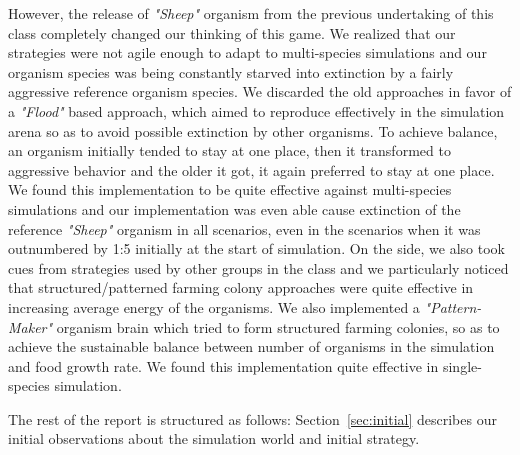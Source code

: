 However, the release of {\em "Sheep"} organism from the previous 
undertaking of this class completely changed our thinking of this game. 
We realized that our strategies were not agile enough to adapt to 
multi-species simulations and our organism species was being constantly 
starved into extinction by a fairly aggressive reference organism species. 
We discarded the old approaches in favor of a {\em "Flood"} based 
approach, which aimed to reproduce effectively in the simulation arena so as 
to avoid possible extinction by other organisms. To achieve balance, an 
organism initially tended to stay at one place, then it transformed to 
aggressive behavior and the older it got, it again preferred to stay at one 
place. 
We found this implementation to be quite effective against multi-species 
simulations and our implementation was even able cause extinction of the 
reference {\em "Sheep"} organism in all scenarios, even in the scenarios 
when it was outnumbered by 1:5 initially at the start of simulation.
On the side, we also took cues from strategies used by other groups in the 
class and we particularly noticed that structured/patterned farming colony 
approaches were quite effective in increasing average energy of the 
organisms. We also implemented a {\em "Pattern-Maker"} organism brain which 
tried to form structured farming colonies, so as to achieve the sustainable 
balance between number of organisms in the simulation and food growth rate. 
We found this implementation quite effective in single-species simulation. 

The rest of the report is structured as follows: Section~\ref{sec:initial} describes 
our initial observations about the simulation world and initial strategy. 
